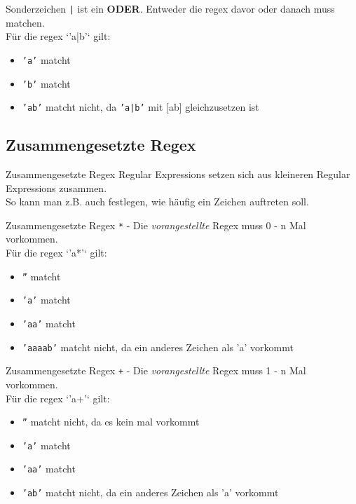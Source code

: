 \begin{frame}{Sonderzeichen}
	\texttt{|} ist ein \textbf{ODER}. Entweder die regex davor oder danach muss matchen.\\[.25cm]
	Für die regex `'a|b'` gilt:\\
	\begin{itemize}
		\item \texttt{'a'} matcht
		\item \texttt{'b'} matcht
		\item \texttt{'ab'} matcht nicht, da \texttt{'a|b'} mit [ab] gleichzusetzen ist
	\end{itemize}
\end{frame}

\subsection{Zusammengesetzte Regex}
\begin{frame}{Zusammengesetzte Regex}
	Regular Expressions setzen sich aus kleineren Regular Expressions zusammen.\\
	So kann man z.B. auch festlegen, wie häufig ein Zeichen auftreten soll.
\end{frame}

\begin{frame}{Zusammengesetzte Regex}
	\texttt{*} - Die \textit{vorangestellte} Regex muss 0 - n Mal vorkommen.\\[.25cm]
	Für die regex `'a*'` gilt:\\
	\begin{itemize}
		\item \texttt{''} matcht
		\item \texttt{'a'} matcht
		\item \texttt{'aa'} matcht
		\item \texttt{'aaaab'} matcht nicht, da ein anderes Zeichen als 'a' vorkommt
	\end{itemize}
\end{frame}

\begin{frame}{Zusammengesetzte Regex}
	\texttt{+} - Die \textit{vorangestellte} Regex muss 1 - n Mal vorkommen.\\[.25cm]
	Für die regex `'a+'` gilt:\\
	\begin{itemize}
		\item \texttt{''} matcht nicht, da es kein mal vorkommt
		\item \texttt{'a'} matcht
		\item \texttt{'aa'} matcht
		\item \texttt{'ab'} matcht nicht, da ein anderes Zeichen als 'a' vorkommt
	\end{itemize}
\end{frame}

